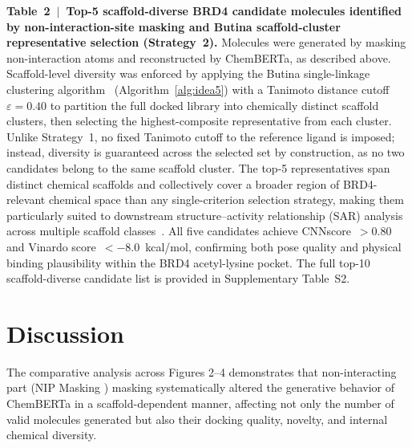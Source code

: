 \documentclass[a4paper,12pt]{article}
\begin{document}

% 
\FloatBarrier
\noindent\small
\textbf{Table~2~$|$~Top-5 scaffold-diverse BRD4 candidate
molecules identified by non-interaction-site masking and
Butina scaffold-cluster representative selection (Strategy~2).}
Molecules were generated by masking non-interaction atoms and
reconstructed by ChemBERTa, as described above.
Scaffold-level diversity was enforced by applying the Butina
single-linkage clustering algorithm~\cite{butina1999}
(Algorithm~\ref{alg:idea5}) with a Tanimoto distance cutoff
$\varepsilon = 0.40$ to partition the full docked library
into chemically distinct scaffold clusters, then selecting
the highest-composite representative from each cluster.
Unlike Strategy~1, no fixed Tanimoto cutoff to the reference
ligand is imposed; instead, diversity is guaranteed across
the selected set by construction, as no two candidates
belong to the same scaffold cluster.
The top-5 representatives span distinct chemical scaffolds
and collectively cover a broader region of BRD4-relevant
chemical space than any single-criterion selection strategy,
making them particularly suited to downstream
structure--activity relationship (SAR) analysis across
multiple scaffold classes~\cite{bemis1996scaffolds}.
All five candidates achieve CNNscore~$> 0.80$ and
Vinardo score~$< -8.0$~kcal/mol, confirming both
pose quality and physical binding plausibility
within the BRD4 acetyl-lysine pocket.
The full top-10 scaffold-diverse candidate list is provided
in Supplementary Table~S2.
\normalsize

\clearpage 
\section{Discussion}


 
The comparative analysis across Figures 2–4 demonstrates that non-interacting part (NIP Masking ) masking systematically altered the generative behavior of ChemBERTa in a scaffold-dependent manner, affecting not only the number of valid molecules generated but also their docking quality, novelty, and internal chemical diversity.
\end{document}

